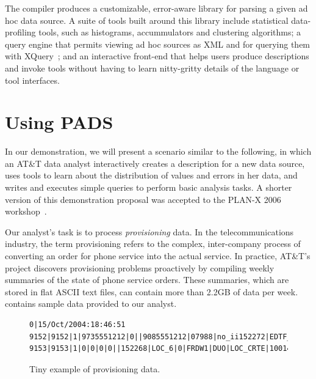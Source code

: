 The \pads{} compiler produces a customizable, error-aware library for
parsing a given ad hoc data source.  A suite of tools built around
this library include statistical data-profiling tools, such as
histograms, accummulators and clustering algorithms; a query engine
that permits viewing ad hoc sources as XML and for querying them with
XQuery~\cite{fernandez+:padx}; and an interactive front-end that helps
users produce \pads{} descriptions and invoke tools without having to
learn nitty-gritty details of the \pads{} language or tool interfaces.

\section{Using PADS}
\label{subsec:example}

In our demonstration, we will present a scenario similar to the
following, in which an AT\&T data analyst interactively creates a
\pads{} description for a new data source, uses \pads{} tools to learn
about the distribution of values and errors in her data, and writes
and executes simple queries to perform basic analysis tasks.  A
shorter version of this demonstration proposal was accepted to the PLAN-X
2006 workshop~\cite{daly+:launchpads}.

Our analyst's task is to process \textit{provisioning} data.  In the
telecommunications industry, the term {provisioning} refers to
the complex, inter-company process of converting an order for phone
service into the actual service.  In practice, AT\&T's \dibbler{}
project discovers provisioning problems proactively by compiling
weekly summaries of the state of phone service
orders.  These summaries, which are stored in flat ASCII text files,
can contain more than 2.2GB of data per
week.  contains sample \dibbler{} data
provided to our analyst.
\begin{figure}
\begin{small}
\begin{center}
\begin{verbatim}
0|15/Oct/2004:18:46:51
9152|9152|1|9735551212|0||9085551212|07988|no_ii152272|EDTF_6|0|APRL1|DUO|10|16/Oct/2004:10:02:10
9153|9153|1|0|0|0|0||152268|LOC_6|0|FRDW1|DUO|LOC_CRTE|1001476800|LOC_OS_10|17/Oct/2004:08:14:21
\end{verbatim}
\caption{Tiny example of \dibbler{} provisioning data.}
\label{figure:dibbler-records}
\end{center}
\end{small}
\end{figure}

